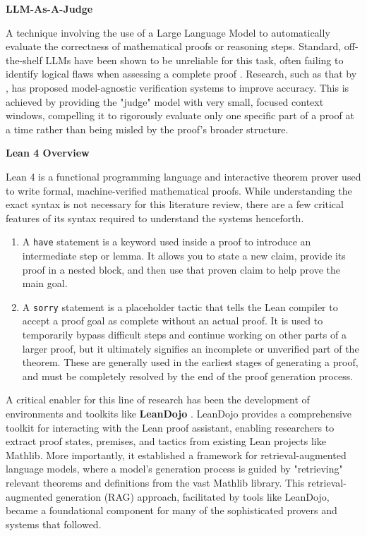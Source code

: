 \documentclass[12pt, letterpaper]{article}
\begin{document}
\textbf{LLM-As-A-Judge}

A technique involving the use of a Large Language Model to automatically evaluate the correctness of mathematical proofs or reasoning steps. Standard, off-the-shelf LLMs have been shown to be unreliable for this task, often failing to identify logical flaws when assessing a complete proof \citep{guo2025rightenoughpitfallsoutcome}. Research, such as that by \citet{guo2025rightenoughpitfallsoutcome}, has proposed model-agnostic verification systems to improve accuracy. This is achieved by providing the "judge" model with very small, focused context windows, compelling it to rigorously evaluate only one specific part of a proof at a time rather than being misled by the proof's broader structure.

\textbf{Lean 4 Overview}

Lean 4 is a functional programming language and interactive theorem prover used to write formal, machine-verified mathematical proofs. While understanding the exact syntax is not necessary for this literature review, there are a few critical features of its syntax required to understand the systems henceforth.

\begin{enumerate}
    \item A \texttt{have} statement is a keyword used inside a proof to introduce an intermediate step or lemma. It allows you to state a new claim, provide its proof in a nested block, and then use that proven claim to help prove the main goal.
    \item A \texttt{sorry} statement is a placeholder tactic that tells the Lean compiler to accept a proof goal as complete without an actual proof. It is used to temporarily bypass difficult steps and continue working on other parts of a larger proof, but it ultimately signifies an incomplete or unverified part of the theorem. These are generally used in the earliest stages of generating a proof, and must be completely resolved by the end of the proof generation process.
\end{enumerate}


A critical enabler for this line of research has been the development of environments and toolkits like \textbf{LeanDojo} \citep{yang2023leandojotheoremprovingretrievalaugmented}. LeanDojo provides a comprehensive toolkit for interacting with the Lean proof assistant, enabling researchers to extract proof states, premises, and tactics from existing Lean projects like Mathlib. More importantly, it established a framework for retrieval-augmented language models, where a model's generation process is guided by "retrieving" relevant theorems and definitions from the vast Mathlib library. This retrieval-augmented generation (RAG) approach, facilitated by tools like LeanDojo, became a foundational component for many of the sophisticated provers and systems that followed.
\end{document}
